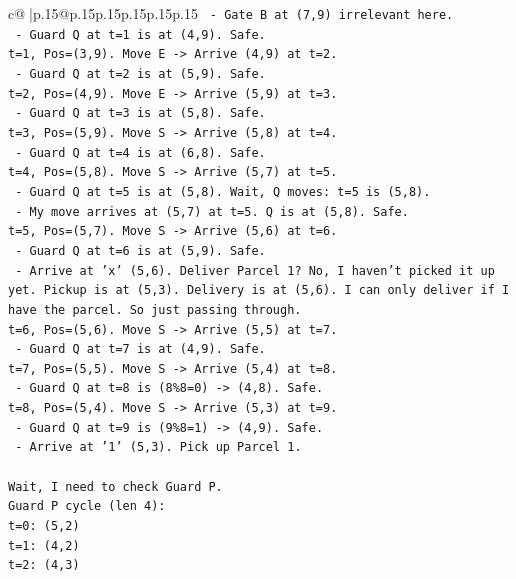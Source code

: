 \documentclass{article}
\begin{document}
{\begin{supertabular}{c@{$\;$}|p{.15\linewidth}@{}p{.15\linewidth}p{.15\linewidth}p{.15\linewidth}p{.15\linewidth}p{.15\linewidth}}
{{{\texttt{  {-} Gate B at (7,9) irrelevant here.} \\
\texttt{  {-} Guard Q at t=1 is at (4,9). Safe.} \\
\texttt{t=1, Pos=(3,9). Move E {-}> Arrive (4,9) at t=2.} \\
\texttt{  {-} Guard Q at t=2 is at (5,9). Safe.} \\
\texttt{t=2, Pos=(4,9). Move E {-}> Arrive (5,9) at t=3.} \\
\texttt{  {-} Guard Q at t=3 is at (5,8). Safe.} \\
\texttt{t=3, Pos=(5,9). Move S {-}> Arrive (5,8) at t=4.} \\
\texttt{  {-} Guard Q at t=4 is at (6,8). Safe.} \\
\texttt{t=4, Pos=(5,8). Move S {-}> Arrive (5,7) at t=5.} \\
\texttt{  {-} Guard Q at t=5 is at (5,8). Wait, Q moves: t=5 is (5,8).} \\
\texttt{  {-} My move arrives at (5,7) at t=5. Q is at (5,8). Safe.} \\
\texttt{t=5, Pos=(5,7). Move S {-}> Arrive (5,6) at t=6.} \\
\texttt{  {-} Guard Q at t=6 is at (5,9). Safe.} \\
\texttt{  {-} Arrive at 'x' (5,6). Deliver Parcel 1? No, I haven't picked it up yet. Pickup is at (5,3). Delivery is at (5,6). I can only deliver if I have the parcel. So just passing through.} \\
\texttt{t=6, Pos=(5,6). Move S {-}> Arrive (5,5) at t=7.} \\
\texttt{  {-} Guard Q at t=7 is at (4,9). Safe.} \\
\texttt{t=7, Pos=(5,5). Move S {-}> Arrive (5,4) at t=8.} \\
\texttt{  {-} Guard Q at t=8 is (8\%8=0) {-}> (4,8). Safe.} \\
\texttt{t=8, Pos=(5,4). Move S {-}> Arrive (5,3) at t=9.} \\
\texttt{  {-} Guard Q at t=9 is (9\%8=1) {-}> (4,9). Safe.} \\
\texttt{  {-} Arrive at '1' (5,3). Pick up Parcel 1.} \\
\\ 
\texttt{Wait, I need to check Guard P.} \\
\texttt{Guard P cycle (len 4):} \\
\texttt{t=0: (5,2)} \\
\texttt{t=1: (4,2)} \\
\texttt{t=2: (4,3)} \\
}}}
\end{supertabular}}
\end{document}

